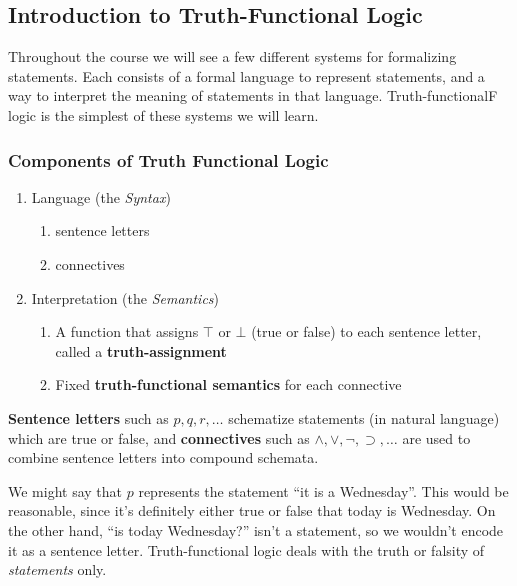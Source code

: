 \subsection{Introduction to Truth-Functional Logic}
Throughout the course we will see a few different systems for formalizing statements. Each consists of a formal language to represent statements, and a way to interpret the meaning of statements in that language. Truth-functionalF logic is the simplest of these systems we will learn. 

\subsubsection*{Components of Truth Functional Logic}
\begin{enumerate}
    \item Language (the \emph{Syntax})
    \begin{enumerate}
        \item sentence letters
        \item connectives
    \end{enumerate}
    \item Interpretation (the \emph{Semantics})
    \begin{enumerate}
        \item A function that assigns $\top$ or $\bot$ (true or false) to each sentence letter, called a \textbf{truth-assignment}
        \item Fixed \textbf{truth-functional semantics} for each connective
    \end{enumerate}
\end{enumerate}

\textbf{Sentence letters} such as $p, q, r, \ldots$ schematize statements (in natural language) which are true or false, and \textbf{connectives} such as $\wedge, \vee, \neg, \supset, \ldots$ are used to combine sentence letters into compound schemata. 

\begin{example}
We might say that $p$ represents the statement ``it is a Wednesday''. This would be reasonable, since it's definitely either true or false that today is Wednesday. On the other hand, ``is today Wednesday?'' isn't a statement, so we wouldn't encode it as a sentence letter. Truth-functional logic deals with the truth or falsity of \emph{statements} only. 
\end{example}